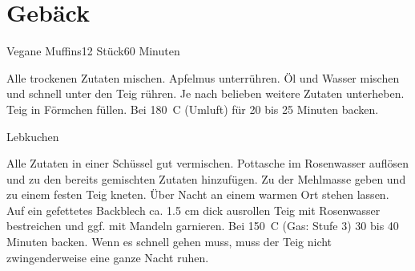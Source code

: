 \documentclass[a4paper,10pt]{article}
\begin{document}
    \newpage
    
    
    \section{Gebäck}

    \begin{recipe}{Vegane Muffins}{12 Stück}{60 Minuten}
        
        \freeform \hfill 
        
            Alle trockenen Zutaten mischen.
            Apfelmus unterrühren.
            Öl und Wasser mischen und schnell unter den Teig rühren.
            Je nach belieben weitere Zutaten unterheben.
        \newstep
            Teig in Förmchen füllen. Bei 180~\degrees C (Umluft) für 20 bis 25 
            Minuten backen.
    \end{recipe}
    
    \newpage
    
    \begin{recipe}{Lebkuchen}{}{}
    
        \freeform \hfill 
      
        Alle Zutaten in einer Schüssel gut vermischen.
        Pottasche im Rosenwasser auflösen und zu den bereits gemischten Zutaten 
        hinzufügen.
        Zu der Mehlmasse geben und zu einem festen Teig kneten. \"Uber Nacht an 
        einem warmen Ort stehen lassen. Auf ein gefettetes Backblech ca. 1.5 cm 
        dick ausrollen
        Teig mit Rosenwasser bestreichen und ggf. mit Mandeln garnieren. Bei 
        150~\degrees C (Gas: Stufe 3) 30 bis 40 Minuten backen.
        \freeform Wenn es schnell gehen muss, muss der Teig nicht 
        zwingenderweise eine ganze Nacht ruhen.
    \end{recipe}
\end{document}
